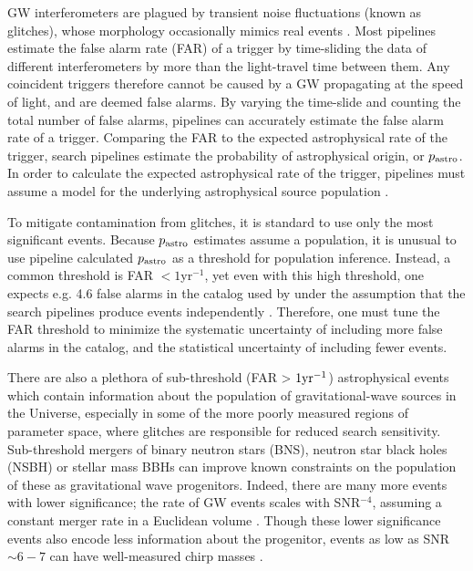\begin{refsection}
GW interferometers are plagued by transient noise fluctuations (known as glitches), whose morphology occasionally mimics real events \citep{2019CQGra..36o5010C, 2017CQGra..34f4003Z, 2021CQGra..38m5014D,2021CQGra..38s5016S,2022arXiv221015633A,2022arXiv221015634A, 2021PTEP.2021eA102A, 2022CQGra..39q5004A}. Most pipelines estimate the false alarm rate (FAR) of a trigger by time-sliding the data of different interferometers by more than the light-travel time between them. Any coincident triggers therefore cannot be caused by a GW propagating at the speed of light, and are deemed false alarms. By varying the time-slide and counting the total number of false alarms, pipelines can accurately estimate the false alarm rate of a trigger. Comparing the FAR to the expected astrophysical rate of the trigger, search pipelines estimate the probability of astrophysical origin, or $p_{\rm astro}$. In order to calculate the expected astrophysical rate of the trigger, pipelines must assume a model for the underlying astrophysical source population \citep{2021arXiv211103606T}. 

To mitigate contamination from glitches, it is standard to use only the most significant events. Because $p_{\rm astro}$ estimates assume a population, it is unusual to use pipeline calculated $p_{\rm astro}$ as a threshold for population inference. Instead, a common threshold is FAR $< 1$yr$^{-1}$, yet even with this high threshold, one expects e.g. 4.6 false alarms in the catalog used by \cite{PhysRevX.13.011048} under the assumption that the search pipelines produce events independently \citep{2005PhRvD..71f2001A,2016CQGra..33u5004U,2017ApJ...849..118N,2017PhRvD..95d2001M,2020PhRvD.101b2003H,PhysRevX.13.011048}. 
Therefore, one must tune the FAR threshold to minimize the systematic uncertainty of including more false alarms in the catalog, and the statistical uncertainty of including fewer events. 

There are also a plethora of sub-threshold (FAR > $1 {\rm yr}^{-1}$) astrophysical events which contain information about the population of gravitational-wave sources in the Universe, especially in some of the more poorly measured regions of parameter space, where glitches are responsible for reduced search sensitivity. Sub-threshold mergers of binary neutron stars (BNS), neutron star black holes (NSBH) or stellar mass BBHs can improve known constraints on the population of these as gravitational wave progenitors. Indeed, there are many more events with lower significance; the rate of GW events scales with SNR${}^{-4}$, assuming a constant merger rate in a Euclidean volume \citep{2011CQGra..28l5023S, 2014arXiv1409.0522C}. Though these lower significance events also encode less information about the progenitor, events as low as SNR$\sim 6-7$ can have well-measured chirp masses \citep{2018PhRvD..98l3021H}. 


\end{refsection}
